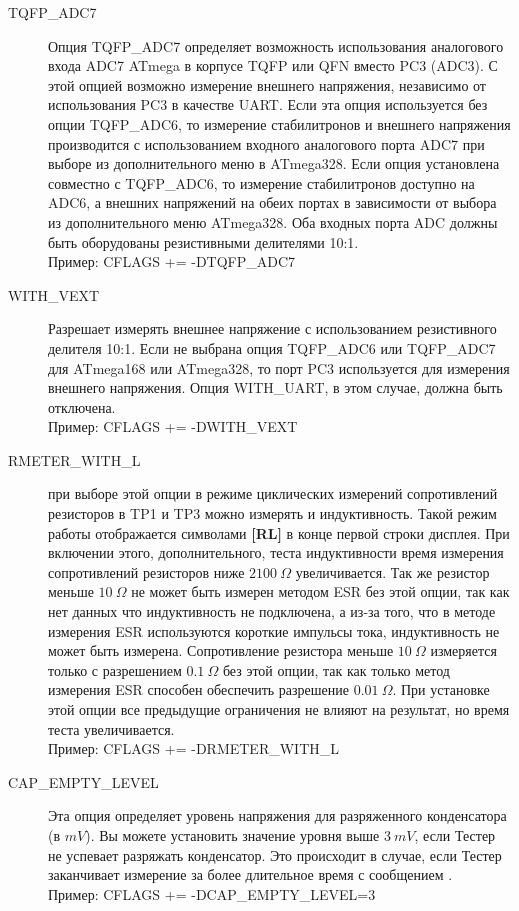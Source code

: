 \begin{description}
  \item[TQFP\_ADC7] Опция TQFP\_ADC7 определяет возможность использования аналогового входа ADC7 ATmega в корпусе 
TQFP или QFN вместо PC3 (ADC3). С этой опцией возможно измерение внешнего напряжения, независимо от использования 
PC3 в качестве UART. Если эта опция используется без опции TQFP\_ADC6, то измерение стабилитронов и внешнего
напряжения производится с использованием входного аналогового порта ADC7 при выборе из дополнительного меню в 
ATmega328. Если опция установлена совместно с TQFP\_ADC6, то измерение стабилитронов доступно на ADC6, а внешних 
напряжений на обеих портах в зависимости от выбора из дополнительного меню ATmega328. Оба входных порта ADC
должны быть оборудованы резистивными делителями 10:1.\\
Пример: CFLAGS += -DTQFP\_ADC7

  \item[WITH\_VEXT] Разрешает измерять внешнее напряжение с использованием резистивного делителя 10:1.
Если не выбрана опция TQFP\_ADC6 или TQFP\_ADC7 для ATmega168 или ATmega328, то порт PC3 используется для измерения 
внешнего напряжения.
Опция WITH\_UART, в этом случае, должна быть отключена.\\
Пример: CFLAGS += -DWITH\_VEXT

  \item[RMETER\_WITH\_L] при выборе этой опции в режиме циклических измерений сопротивлений резисторов в TP1 и TP3 
  можно измерять и индуктивность. Такой режим работы отображается символами \textbf{[RL]} в конце первой строки дисплея.
При включении этого, дополнительного, теста индуктивности время измерения сопротивлений резисторов 
ниже \(2100~\Omega\) увеличивается.
Так же резистор меньше \(10~\Omega\) не может быть измерен методом ESR без этой опции, так как нет 
данных что индуктивность не подключена, а из-за того, что в методе измерения ESR используются короткие 
импульсы тока, индуктивность не может быть измерена. Сопротивление резистора меньше \(10~\Omega\) измеряется только
с разрешением \(0.1~\Omega\) без этой опции, так как только метод измерения ESR способен обеспечить 
разрешение \(0.01~\Omega\).
При установке этой опции все предыдущие ограничения не влияют на результат, но время теста увеличивается.\\
Пример: CFLAGS += -DRMETER\_WITH\_L

  \item[CAP\_EMPTY\_LEVEL] Эта опция  определяет уровень напряжения для разряженного конденсатора (в \(mV\)). Вы можете 
установить значение уровня выше \(3~mV\), если Тестер не успевает разряжать конденсатор. Это происходит в случае, если 
Тестер заканчивает измерение за более длительное время с сообщением .\\
Пример: CFLAGS += -DCAP\_EMPTY\_LEVEL=3


\end{description}
